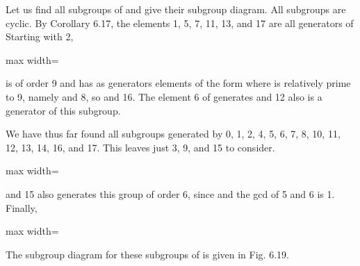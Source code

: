 \documentclass[11pt,oneside]{article}
\begin{document}
\begin{BookBody}

 Let us find all subgroups of  and give their subgroup diagram. All subgroups are cyclic. By Corollary 6.17, the elements 1, 5, 7, 11, 13, and 17 are all generators of  Starting with 2,

\begin{center}\begin{adjustbox}{max width=\linewidth}\end{adjustbox}\end{center}

\noindent is of order 9 and has as generators elements of the form  where  is relatively prime to 9, namely and 8, so  and 16. The element 6 of \BookInline{\langle 2\rangle } generates  and 12 also is a generator of this subgroup.

We have thus far found all subgroups generated by 0, 1, 2, 4, 5, 6, 7, 8, 10, 11, 12, 13, 14, 16, and 17. This leaves just 3, 9, and 15 to consider.

\begin{center}\begin{adjustbox}{max width=\linewidth}\end{adjustbox}\end{center}

\noindent and 15 also generates this group of order 6, since  and the gcd of 5 and 6 is 1. Finally,

\begin{center}\begin{adjustbox}{max width=\linewidth}\end{adjustbox}\end{center}

\noindent The subgroup diagram for these subgroups of  is given in Fig. 6.19.


\end{BookBody}
\end{document}
